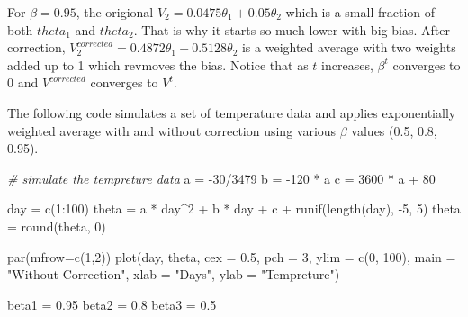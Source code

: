 \documentclass[
  12pt,
]{krantz}
\makeatletter
\newenvironment{Shaded}{\begin{snugshade}}{\end{snugshade}}
\newcommand{\AttributeTok}[1]{\textcolor[rgb]{0.61,0.61,0.61}{#1}}
\newcommand{\CommentTok}[1]{\textcolor[rgb]{0.37,0.37,0.37}{\textit{#1}}}
\newcommand{\DecValTok}[1]{\textcolor[rgb]{0.06,0.06,0.06}{#1}}
\newcommand{\FloatTok}[1]{\textcolor[rgb]{0.06,0.06,0.06}{#1}}
\newcommand{\FunctionTok}[1]{\textcolor[rgb]{0,0,0}{#1}}
\newcommand{\NormalTok}[1]{#1}
\newcommand{\OtherTok}[1]{\textcolor[rgb]{0.37,0.37,0.37}{#1}}
\newcommand{\SpecialCharTok}[1]{\textcolor[rgb]{0,0,0}{#1}}
\newcommand{\StringTok}[1]{\textcolor[rgb]{0.5,0.5,0.5}{#1}}
\newenvironment{kframe}{%
\medskip{}
\setlength{\fboxsep}{.8em}
 \def\at@end@of@kframe{}%
 \ifinner\ifhmode%
  \def\at@end@of@kframe{\end{minipage}}%
  \begin{minipage}{\columnwidth}%
 \fi\fi%
 \def\FrameCommand##1{\hskip\@totalleftmargin \hskip-\fboxsep
 \colorbox{shadecolor}{##1}\hskip-\fboxsep
     \hskip-\linewidth \hskip-\@totalleftmargin \hskip\columnwidth}%
 \MakeFramed {\advance\hsize-\width
   \@totalleftmargin\z@ \linewidth\hsize
   \@setminipage}}%
 {\par\unskip\endMakeFramed%
 \at@end@of@kframe}
\renewenvironment{Shaded}{\begin{kframe}}{\end{kframe}}
\makeatother
\begin{document}
For \(\beta = 0.95\), the origional \(V_2 = 0.0475\theta_{1}+0.05\theta_{2}\) which is a small fraction of both \(theta_1\) and \(theta_2\). That is why it starts so much lower with big bias. After correction, \(V_{2}^{corrected} = 0.4872\theta_{1}+0.5128\theta_{2}\) is a weighted average with two weights added up to 1 which revmoves the bias. Notice that as \(t\) increases, \(\beta^t\) converges to 0 and \(V^{corrected}\) converges to \(V^t\).

The following code simulates a set of temperature data and applies exponentially weighted average with and without correction using various \(\beta\) values (0.5, 0.8, 0.95).

\begin{Shaded}
\begin{Highlighting}[]
\CommentTok{\# simulate the tempreture data}
\NormalTok{a }\OtherTok{=} \SpecialCharTok{{-}}\DecValTok{30}\SpecialCharTok{/}\DecValTok{3479}
\NormalTok{b }\OtherTok{=} \SpecialCharTok{{-}}\DecValTok{120} \SpecialCharTok{*}\NormalTok{ a}
\NormalTok{c }\OtherTok{=} \DecValTok{3600} \SpecialCharTok{*}\NormalTok{ a }\SpecialCharTok{+} \DecValTok{80}

\NormalTok{day }\OtherTok{=} \FunctionTok{c}\NormalTok{(}\DecValTok{1}\SpecialCharTok{:}\DecValTok{100}\NormalTok{)}
\NormalTok{theta }\OtherTok{=}\NormalTok{ a }\SpecialCharTok{*}\NormalTok{ day}\SpecialCharTok{\^{}}\DecValTok{2} \SpecialCharTok{+}\NormalTok{ b }\SpecialCharTok{*}\NormalTok{ day }\SpecialCharTok{+}\NormalTok{ c }\SpecialCharTok{+} \FunctionTok{runif}\NormalTok{(}\FunctionTok{length}\NormalTok{(day), }\SpecialCharTok{{-}}\DecValTok{5}\NormalTok{, }\DecValTok{5}\NormalTok{)}
\NormalTok{theta }\OtherTok{=} \FunctionTok{round}\NormalTok{(theta, }\DecValTok{0}\NormalTok{)}

\FunctionTok{par}\NormalTok{(}\AttributeTok{mfrow=}\FunctionTok{c}\NormalTok{(}\DecValTok{1}\NormalTok{,}\DecValTok{2}\NormalTok{))}
\FunctionTok{plot}\NormalTok{(day, theta, }\AttributeTok{cex =} \FloatTok{0.5}\NormalTok{, }\AttributeTok{pch =} \DecValTok{3}\NormalTok{, }\AttributeTok{ylim =} \FunctionTok{c}\NormalTok{(}\DecValTok{0}\NormalTok{, }\DecValTok{100}\NormalTok{),}
     \AttributeTok{main =} \StringTok{"Without Correction"}\NormalTok{,}
     \AttributeTok{xlab =} \StringTok{"Days"}\NormalTok{, }\AttributeTok{ylab =} \StringTok{"Tempreture"}\NormalTok{)}

\NormalTok{beta1 }\OtherTok{=} \FloatTok{0.95}
\NormalTok{beta2 }\OtherTok{=} \FloatTok{0.8}
\NormalTok{beta3 }\OtherTok{=} \FloatTok{0.5}


\end{Highlighting}
\end{Shaded}
\end{document}
